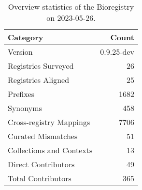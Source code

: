 \begin{table}
\caption{Overview statistics of the Bioregistry on 2023-05-26.}
\label{tab:bioregistry-summary}
\begin{tabular}{lr}
\toprule
Category & Count \\
\midrule
Version & 0.9.25-dev \\
Registries Surveyed & 26 \\
Registries Aligned & 25 \\
Prefixes & 1682 \\
Synonyms & 458 \\
Cross-registry Mappings & 7706 \\
Curated Mismatches & 51 \\
Collections and Contexts & 13 \\
Direct Contributors & 49 \\
Total Contributors & 365 \\
\bottomrule
\end{tabular}
\end{table}

